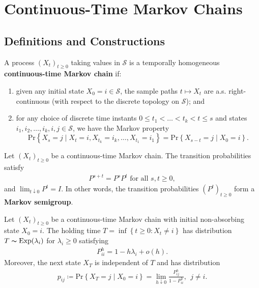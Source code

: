 \section{Continuous-Time Markov Chains}

\subsection{Definitions and Constructions}

\begin{defn}{}{}
A process \((X_{t} )_{t\geq 0}\) taking values in \(\mathcal{S} \) is a temporally homogeneous \textbf{continuous-time Markov chain} if:
\begin{enumerate}[label = \emph{(\roman*)}]
    \item given any initial state \(X_0 = i \in \mathcal{S} \), the sample paths \(t \mapsto X_{t} \) are a.s. right-continuous (with respect to the discrete topology on \(\mathcal{S} \)); and 
    \item for any choice of discrete time instants \(0\leq t_1 < \dots < t_{k} <t \leq s\) and states \(i_1, i_2, \dots , i_k, i , j \in \mathcal{S} \), we have the Markov property
    \[
        \mathrm{Pr} \left\{ X_{s} = j \mid X_{t} = i, X_{t_{k} }= i_{k}, \dots , X_{t_1} = i_1  \right\}  = \mathrm{Pr} \left\{ X_{s - t} = j \mid X_0 = i  \right\}.
    \]
\end{enumerate}


\end{defn}

\begin{thrm}{}{}
    Let \((X_{t} )_{t\geq 0}\) be a continuous-time Markov chain. The transition probabilities satisfy 
    \begin{align*}
        P^{s +t} = P^s P^t \text{ for all } s,t\geq 0,
    \end{align*}
    and \(\lim_{t \downarrow 0} P^t = I \). In other words, the transition probabilities \((P^t)_{t\geq 0}\)  form a \textbf{Markov semigroup}. 
    \end{thrm}

    \begin{thrm}{}{}
    Let \((X_{t} )_{t \geq 0}\) be a continuous-time Markov chain with initial non-absorbing state \(X_0 = i\). The holding time \(T = \inf \left\{ t\geq 0: X_{t} \neq i \right\} \) has distribution \(T \thicksim \mathrm{Exp}(\lambda _{i} )  \) for \(\lambda _{i} \geq 0\) satisfying
    \begin{align*}
        P_{i i }^{h} = 1 - h \lambda _{i} + o(h). 
    \end{align*}
    Moreover, the next state \(X_{T} \) is independent of \(T\) and has distribution \begin{align*}
        p_{ij} \coloneqq \mathrm{Pr} \left\{ X_{T} = j \mid X_0 = i \right\}  = \lim_{h \downarrow 0} \frac{P_{ij}^h }{1 - P_{i i}^h }, \ \ j \neq i. 
    \end{align*}
    
    \end{thrm}

